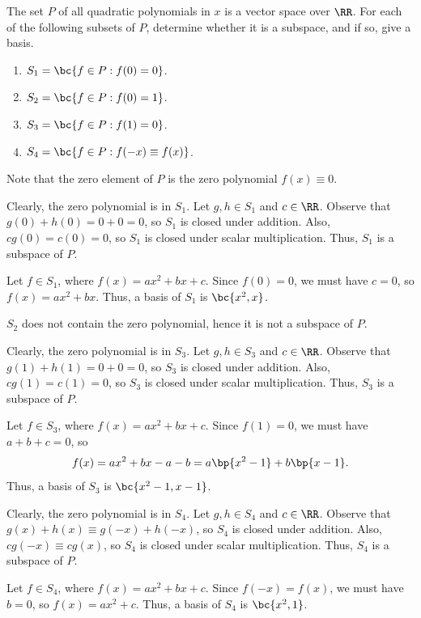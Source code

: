 \begin{problem}
    The set $P$ of all quadratic polynomials in $x$ is a vector space over $\RR$. For each of the following subsets of $P$, determine whether it is a subspace, and if so, give a basis.

    \begin{enumerate}
        \item $S_1 = \bc{f \in P : f(0) = 0}$.
        \item $S_2 = \bc{f \in P : f(0) = 1}$.
        \item $S_3 = \bc{f \in P : f(1) = 0}$.
        \item $S_4 = \bc{f \in P : f(-x) \equiv f(x)}$.
    \end{enumerate}
\end{problem}
\begin{solution}
    Note that the zero element of $P$ is the zero polynomial $f(x) \equiv 0$.

    \begin{ppart}
        Clearly, the zero polynomial is in $S_1$. Let $g, h \in S_1$ and $c \in \RR$. Observe that $g(0) + h(0) = 0 + 0 = 0$, so $S_1$ is closed under addition. Also, $cg(0) = c(0) = 0$, so $S_1$ is closed under scalar multiplication. Thus, $S_1$ is a subspace of $P$.

        Let $f \in S_1$, where $f(x) = ax^2 + bx + c$. Since $f(0) = 0$, we must have $c = 0$, so $f(x) = ax^2 +bx$. Thus, a basis of $S_1$ is $\bc{x^2, x}$.
    \end{ppart}
    \begin{ppart}
        $S_2$ does not contain the zero polynomial, hence it is not a subspace of $P$.
    \end{ppart}
    \begin{ppart}
        Clearly, the zero polynomial is in $S_3$. Let $g, h \in S_3$ and $c \in \RR$. Observe that $g(1) + h(1) = 0 + 0 = 0$, so $S_3$ is closed under addition. Also, $cg(1) = c(1) = 0$, so $S_3$ is closed under scalar multiplication. Thus, $S_3$ is a subspace of $P$.

        Let $f \in S_3$, where $f(x) = ax^2 + bx + c$. Since $f(1) = 0$, we must have $a + b + c = 0$, so \[f(x) = ax^2 +bx - a - b = a\bp{x^2 - 1} + b\bp{x -1}.\] Thus, a basis of $S_3$ is $\bc{x^2 - 1, x - 1}$.
    \end{ppart}
    \begin{ppart}
        Clearly, the zero polynomial is in $S_4$. Let $g, h \in S_4$ and $c \in \RR$. Observe that $g(x) + h(x) \equiv g(-x) + h(-x)$, so $S_4$ is closed under addition. Also, $cg(-x) \equiv cg(x)$, so $S_4$ is closed under scalar multiplication. Thus, $S_4$ is a subspace of $P$.

        Let $f \in S_4$, where $f(x) = ax^2 + bx + c$. Since $f(-x) = f(x)$, we must have $b = 0$, so $f(x) = ax^2 + c$. Thus, a basis of $S_4$ is $\bc{x^2, 1}$.
    \end{ppart}
\end{solution}

